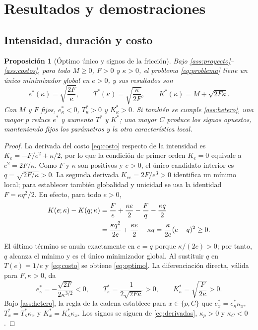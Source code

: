 \documentclass[11pt]{article}
\newtheorem{proposition}{Proposición}
\begin{document}
\section{Resultados y demostraciones}\label{sec:resultados}
\subsection{Intensidad, duración y costo}
\begin{proposition}[Óptimo único y signos de la fricción]\label{prop:uno}
Bajo \ref{ass:proyecto}--\ref{ass:costos}, para todo $M\geq0$, $F>0$ y $\kappa>0$, el problema \eqref{eq:problema} tiene un único minimizador global en $e>0$, y sus resultados son
\begin{equation}\label{eq:optimo}
 e^*(\kappa)=\sqrt{\frac{2F}{\kappa}},\qquad
 T^*(\kappa)=\sqrt{\frac{\kappa}{2F}},\qquad
 K^*(\kappa)=M+\sqrt{2F\kappa}.
\end{equation}
Con $M$ y $F$ fijos, $e^*_{\kappa}<0$, $T^*_{\kappa}>0$ y $K^*_{\kappa}>0$. Si también se cumple \ref{ass:hetero}, una mayor $p$ reduce $e^*$ y aumenta $T^*$ y $K^*$; una mayor $C$ produce los signos opuestos, manteniendo fijos los parámetros y la otra característica local.
\end{proposition}
\begin{proof}
La derivada del costo \eqref{eq:costo} respecto de la intensidad es $K_e=-F/e^2+\kappa/2$, por lo que la condición de primer orden $K_e=0$ equivale a $e^2=2F/\kappa$. Como $F$ y $\kappa$ son positivos y $e>0$, el único candidato interior es $q=\sqrt{2F/\kappa}>0$. La segunda derivada $K_{ee}=2F/e^3>0$ identifica un mínimo local; para establecer también globalidad y unicidad se usa la identidad $F=\kappa q^2/2$. En efecto, para todo $e>0$,
\begin{align}\label{eq:brecha}
 K(e;\kappa)-K(q;\kappa)
 &=\frac Fe+\frac{\kappa e}{2}-\frac Fq-\frac{\kappa q}{2}\notag\\
 &=\frac{\kappa q^2}{2e}+\frac{\kappa e}{2}-\kappa q
 =\frac{\kappa}{2e}(e-q)^2\geq0.
\end{align}
El último término se anula exactamente en $e=q$ porque $\kappa/(2e)>0$; por tanto, $q$ alcanza el mínimo y es el único minimizador global. Al sustituir $q$ en $T(e)=1/e$ y \eqref{eq:costo} se obtiene \eqref{eq:optimo}. La diferenciación directa, válida para $F,\kappa>0$, da
\begin{equation}\label{eq:derivadas}
 e^*_{\kappa}=-\frac{\sqrt{2F}}{2\kappa^{3/2}}<0,\qquad
 T^*_{\kappa}=\frac{1}{2\sqrt{2F\kappa}}>0,\qquad
 K^*_{\kappa}=\sqrt{\frac{F}{2\kappa}}>0.
\end{equation}
Bajo \ref{ass:hetero}, la regla de la cadena establece para $x\in\{p,C\}$ que $e_x^*=e_{\kappa}^*\kappa_x$, $T_x^*=T_{\kappa}^*\kappa_x$ y $K_x^*=K_{\kappa}^*\kappa_x$. Los signos se siguen de \eqref{eq:derivadas}, $\kappa_p>0$ y $\kappa_C<0$.
\end{proof}
\end{document}
